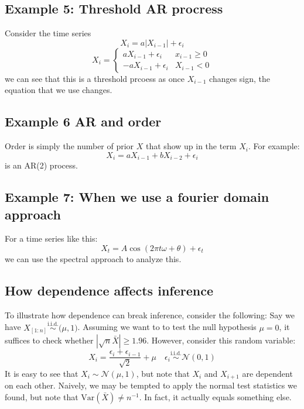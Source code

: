 \documentclass[12pt]{article}
\newcommand{\Var}{\text{Var}}
\newcommand{\iid}{\overset{\text{i.i.d.}}{\sim}}
\begin{document}
\subsection{Example 5: Threshold AR procress }
Consider the time series 
\[
	X_i = a|X_{i-1}| + \epsilon_i  
\]
\[
	X_i = \begin{cases}
		aX_{i-1} + \epsilon_i & x_{i-1} \geq 0 \\ 
		-aX_{i-1} + \epsilon_i & X_{i-1} < 0 
	\end{cases}
\]
we can see that this is a threshold prcoess as once $X_{i-1}$ changes sign, the equation that we use changes. 
\subsection{Example 6 AR and order}
Order is simply the number of prior $X$ that show up in the term $X_i$. For example:
\[
	X_i = aX_{i-1} + bX_{i-2} + \epsilon_i
\]
is an AR(2) process. 
\subsection{Example 7: When we use a fourier domain approach}
For a time series like this:
\[
	X_t = A \cos(2\pi t\omega + \theta) + \epsilon_t 
\]
we can use the spectral approach to analyze this. 
\subsection{How dependence affects inference}
To illustrate how dependence can break inference, consider the following: Say we have $X_{[1:n]} \iid \mathcal(\mu, 1)$. Assuming we want to to test the null hypothesis $\mu = 0$, it suffices to check whether $|\sqrt{n} \bar{X}| \geq 1.96$. However, consider this random variable:
\[
	X_i = \frac{\epsilon_i + \epsilon_{i - 1}}{\sqrt{2}} + \mu \quad \epsilon_i \iid \mathcal{N}(0,1)
\]
It is easy to see that $X_i \sim \mathcal{N}(\mu, 1)$, but note that $X_i$ and $X_{i+1}$ are dependent on each other. Naively, we may be tempted to apply the normal test statistics we found, but note that $\Var(\bar{X}) \neq n^{-1}$. In fact, it actually equals something else. 
\end{document}
